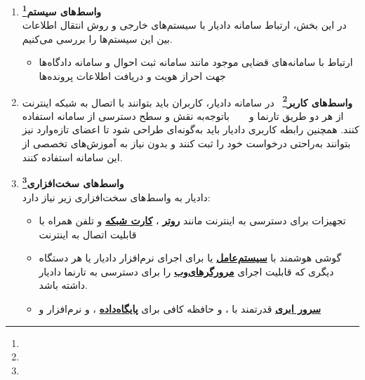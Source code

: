 \documentclass[12pt,a4paper,oneside]{article}
\begin{document}
	\begin{enumerate}
		\item 
		\textbf{واسط‌های سیستم\footnote{}}
		\\
		در این بخش، ارتباط سامانه دادیار با سیستم‌های خارجی و روش انتقال اطلاعات بین این سیستم‌ها را بررسی می‌کنیم.
		\begin{itemize}
			\item ارتباط با سامانه‌های قضایی موجود مانند سامانه ثبت احوال و سامانه دادگاه‌ها جهت احراز هویت و دریافت اطلاعات پرونده‌ها
		\end{itemize}

		\item 
	\textbf{واسط‌های کاربر\footnote{}}
	 در سامانه دادیار، کاربران باید بتوانند با اتصال به شبکه اینترنت از هر دو طریق تارنما و 
	  باتوجه‌به نقش و سطح دسترسی از سامانه استفاده کنند. همچنین رابطه کاربری دادیار باید به‌گونه‌ای طراحی شود تا اعضای تازه‌وارد نیز بتوانند به‌راحتی درخواست خود را ثبت کنند و بدون نیاز به آموزش‌های تخصصی از این سامانه استفاده کنند.


	\item 
	\textbf{واسط‌های سخت‌افزاری\footnote{}}
	\\
	دادیار به واسط‌های سخت‌افزاری زیر نیاز دارد:
	
	\begin{itemize}
		\item
		تجهیزات برای دسترسی به اینترنت مانند 
		\hyperref[ref:router]{\textbf{روتر}}
		، 
		\hyperref[ref:networkcard]{\textbf{کارت شبکه}} 
		و تلفن همراه با قابلیت اتصال به اینترنت
		
		\item
		گوشی هوشمند با 
		\hyperref[ref:os]{\textbf{سیستم‌عامل}} 
		 یا 
		برای اجرای نرم‌افزار 
		دادیار یا هر دستگاه دیگری که قابلیت اجرای 
		\hyperref[ref:browser]{\textbf{مرورگرهای‌وب}}
		 را 
		برای دسترسی به تارنما دادیار داشته باشد.
		
		\item
		\hyperref[ref:cloudserver]{\textbf{سرور ابری}}
		 قدرتمند با 
		،
		 و حافظه کافی برای 
		 \hyperref[ref:database]{\textbf{پایگاه‌داده}}
		 ،
		  و 
		  نرم‌افزار 
		  و 


\end{itemize}
\end{enumerate}
\end{document}
